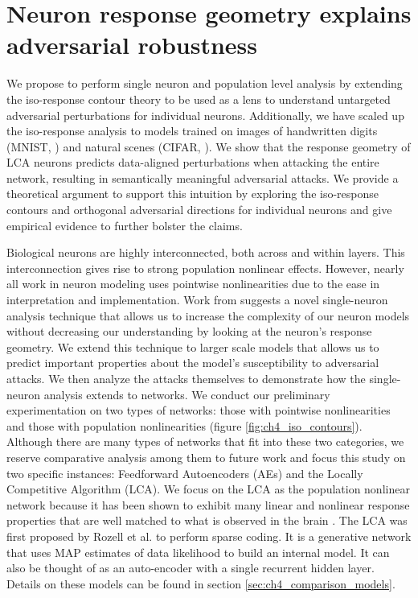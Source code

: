 \section{Neuron response geometry explains adversarial robustness}\label{sec:ch4_neuron}
We propose to perform single neuron and population level analysis by extending the iso-response contour theory to be used as a lens to understand untargeted adversarial perturbations for individual neurons. Additionally, we have scaled up the iso-response analysis to models trained on images of handwritten digits (MNIST, \parencite{lecun1998mnist}) and natural scenes (CIFAR, \parencite{krizhevsky2009learning}). We show that the response geometry of LCA neurons predicts data-aligned perturbations when attacking the entire network, resulting in semantically meaningful adversarial attacks. We provide a theoretical argument to support this intuition by exploring the iso-response contours and orthogonal adversarial directions for individual neurons and give empirical evidence to further bolster the claims. 

Biological neurons are highly interconnected, both across and within layers. This interconnection gives rise to strong population nonlinear effects. However, nearly all work in neuron modeling uses pointwise nonlinearities due to the ease in interpretation and implementation. Work from \citeyearpar{golden2016conjectures} suggests a novel single-neuron analysis technique that allows us to increase the complexity of our neuron models without decreasing our understanding by looking at the neuron’s response geometry. We extend this technique to larger scale models that allows us to predict important properties about the model’s susceptibility to adversarial attacks. We then analyze the attacks themselves to demonstrate how the single-neuron analysis extends to networks. We conduct our preliminary experimentation on two types of networks: those with pointwise nonlinearities and those with population nonlinearities (figure \ref{fig:ch4_iso_contours}). Although there are many types of networks that fit into these two categories, we reserve comparative analysis among them to future work and focus this study on two specific instances: Feedforward Autoencoders (AEs) and the Locally Competitive Algorithm (LCA). We focus on the LCA as the population nonlinear network because it has been shown to exhibit many linear and nonlinear response properties that are well matched to what is observed in the brain \parencite{zhu2013visual, olshausen1997sparse}. The LCA was first proposed by Rozell et al. \citeyearpar{rozell2008sparse} to perform sparse coding. It is a generative network that uses MAP estimates of data likelihood to build an internal model. It can also be thought of as an auto-encoder with a single recurrent hidden layer. Details on these models can be found in section \ref{sec:ch4_comparison_models}.

